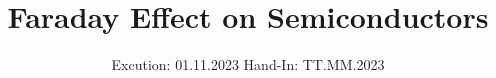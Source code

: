 

\subject{V46}
\title{Faraday Effect on Semiconductors}
\date{%
  Excution: 01.11.2023
  \hspace{3em}
  Hand-In: TT.MM.2023
}



\maketitle
\setcounter{page}{1}







\printbibliography{}


